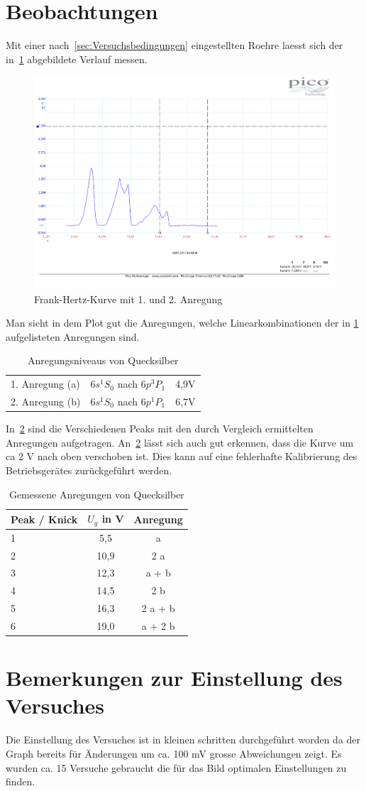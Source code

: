 \section{Beobachtungen}
Mit einer nach~\ref{sec:Versuchsbedingungen} eingestellten Roehre laesst sich der in~\ref{fig:FrankHertz2} abgebildete Verlauf messen.
\begin{figure}
	\includegraphics[width=\textwidth]{../Daten/Frank_Hertz_2.pdf}
	\caption{Frank-Hertz-Kurve mit 1. und 2. Anregung}
	\label{fig:FrankHertz2}
\end{figure}
Man sieht in dem Plot gut die Anregungen, welche Linearkombinationen der in \ref{tab:hgAnr} aufgelisteten Anregungen sind.
\begin{table}
	\centering
	\caption{Anregungsniveaus von Quecksilber}
	\begin{tabular}{l | c c}
		\toprule
		1. Anregung (a) & $6s^1S_0$ nach $6p^3P_1$ & 4,9V\\
		2. Anregung (b)& $6s^1S_0$ nach $6p^1P_1$ & 6,7V\\
	\end{tabular}
	\label{tab:hgAnr}
\end{table}
In~\ref{tab:hgAnrgem} sind die Verschiedenen Peaks mit den durch Vergleich ermittelten Anregungen aufgetragen.
An~\ref{tab:hgAnrgem} lässt sich auch gut erkennen, dass die Kurve um ca 2 V nach oben verschoben ist.
Dies kann auf eine fehlerhafte Kalibrierung des Betriebsgerätes zurückgeführt werden.
\begin{table}
	\centering
	\caption{Gemessene Anregungen von Quecksilber}
	\begin{tabular}{l | c c}
		Peak / Knick & $U_g$ in V& Anregung\\
		\midrule
		1 & 5,5 & a \\
		2 & 10,9 & 2 a \\
		3 & 12,3 & a + b \\
		4 & 14,5 & 2 b \\
		5 & 16,3 & 2 a + b \\
		6 & 19,0 & a + 2 b \\
	\end{tabular}
	\label{tab:hgAnrgem}
\end{table}
\section{Bemerkungen zur Einstellung des Versuches}
Die Einstellung des Versuches ist in kleinen schritten durchgeführt worden da der Graph bereits für Änderungen um ca. 100 mV grosse Abweichungen zeigt.
Es wurden ca. 15 Versuche gebraucht die für das Bild optimalen Einstellungen zu finden.
